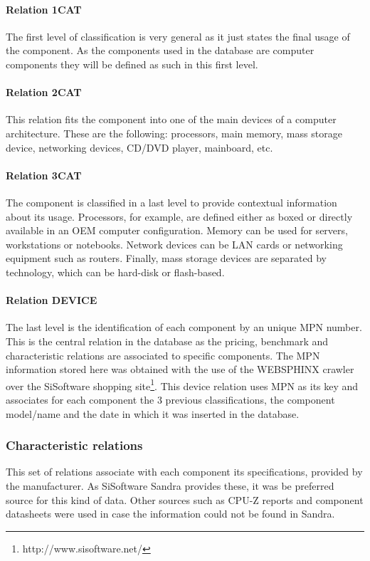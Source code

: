         \paragraph*{Relation 1CAT}
            The first level of classification is very general as it just states the final usage of the component. As the components used in the database are computer components they will be defined as such in this first level.

        \paragraph*{Relation 2CAT}
            This relation fits the component into one of the main devices of a computer architecture. These are the following: processors, main memory, mass storage device, networking devices, CD/DVD player, mainboard, etc.

        \paragraph*{Relation 3CAT}
            The component is classified in a last level to provide contextual information about its usage. Processors, for example, are defined either as boxed or directly available in an OEM computer configuration. Memory can be used for servers, workstations or notebooks. Network devices can be LAN cards or networking equipment such as routers. Finally, mass storage devices are separated by technology, which can be hard-disk or flash-based.

        \paragraph*{Relation DEVICE}
            The last level is the identification of each component by an unique MPN number. This is the central relation in the database as the pricing, benchmark and characteristic relations are associated to specific components. The MPN information stored here was obtained with the use of the WEBSPHINX crawler over the SiSoftware shopping site\footnote{http://www.sisoftware.net/}. This device relation uses MPN as its key and associates for each component the 3 previous classifications, the component model/name and the date in which it was inserted in the database.
            
    \subsubsection*{Characteristic relations}
        This set of relations associate with each component its specifications, provided by the manufacturer. As SiSoftware Sandra provides these, it was be preferred source for this kind of data. Other sources such as CPU-Z reports and component datasheets were used in case the information could not be found in Sandra.
        
